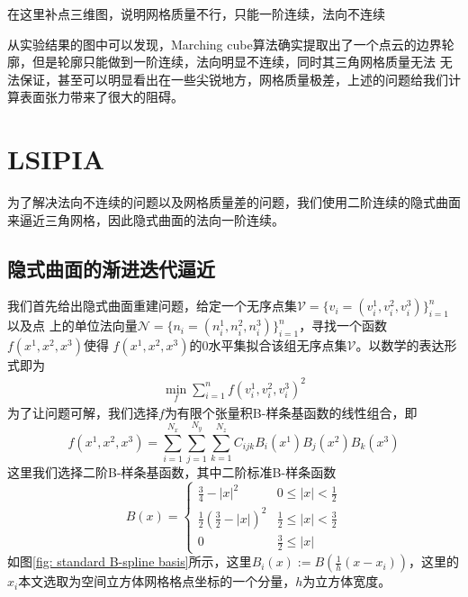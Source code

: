 \textsf{在这里补点三维图，说明网格质量不行，只能一阶连续，法向不连续}


从实验结果的图中可以发现，Marching cube算法确实提取出了一个点云的边界轮廓，但是轮廓只能做到一阶连续，法向明显不连续，同时其三角网格质量无法
无法保证，甚至可以明显看出在一些尖锐地方，网格质量极差，上述的问题给我们计算表面张力带来了很大的阻碍。

\section{LSIPIA}
为了解决法向不连续的问题以及网格质量差的问题，我们使用二阶连续的隐式曲面来逼近三角网格，因此隐式曲面的法向一阶连续。

\subsection{隐式曲面的渐进迭代逼近}
我们首先给出隐式曲面重建问题，给定一个无序点集$\mathcal{V} = \{v_i = (v_i^1,v_i^2,v_i^3)\}_{i = 1}^n$以及点
上的单位法向量$\mathcal{N} = \{n_i = (n_i^1, n_i^2, n_i^3)\}_{i = 1}^n$，寻找一个函数$f(x^1,x^2,x^3)$使得
$f(x^1,x^2,x^3)$的$0$水平集拟合该组无序点集$\mathcal{V}$。以数学的表达形式即为
\begin{equation}
    \begin{split}
        \min_f\sum_{i = 1}^{n} f(v_i^1,v_i^2,v_i^3)^2       
    \end{split}
\end{equation}
为了让问题可解，我们选择$f$为有限个张量积B-样条基函数的线性组合，即$$f(x^1,x^2,x^3) = \sum_{i = 1}^{N_x}\sum_{j = 1}^{N_y}\sum_{k = 1}^{N_z} C_{ijk}B_i(x^1)B_j(x^2)B_k(x^3)$$
这里我们选择二阶B-样条基函数，其中二阶标准B-样条函数
$$B(x) = \begin{cases}
    \frac{3}{4} - \left | x \right | ^2  & 0 \leq \left | x \right | < \frac{1}{2}\\
    \frac{1}{2}(\frac{3}{2} - \left | x \right |)^2 & \frac{1}{2}\leq \left | x \right | <\frac{3}{2}\\
    0 & \frac{3}{2} \leq \left | x \right |
   \end{cases}$$
如图\ref{fig: standard B-spline basis}所示，这里$B_i(x) := B(\frac{1}{h}(x - x_i))$，这里的$x_i$本文选取为空间立方体网格格点坐标的一个分量，$h$为立方体宽度。
